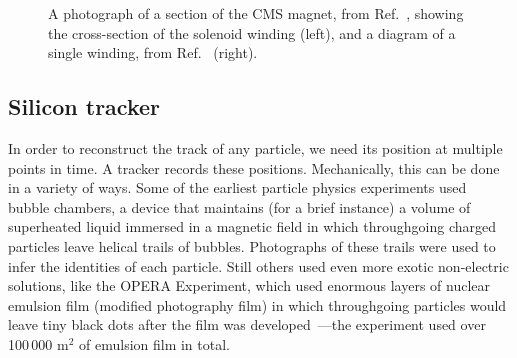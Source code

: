 \begin{figure}[htb]
    \centering
    \quad
    \caption[A photograph of a section of the CMS magnet, from Ref.~\cite{CourierSolenoid}, and a diagram of a single winding, from Ref.~\cite{CERN-LHCC-97-010}]{
        A photograph of a section of the CMS magnet, from Ref.~\cite{CourierSolenoid}, showing the cross-section of the solenoid winding (left), and a diagram of a single winding, from Ref.~\cite{CERN-LHCC-97-010} (right). 
    }
    \label{fig:cms_magnet}
\end{figure}

\subsection{Silicon tracker}
In order to reconstruct the track of any particle, we need its position at multiple points in time. 
A tracker records these positions. 
Mechanically, this can be done in a variety of ways. 
Some of the earliest particle physics experiments used bubble chambers, a device that maintains (for a brief instance) a volume of superheated liquid immersed in a magnetic field in which throughgoing charged particles leave helical trails of bubbles. 
Photographs of these trails were used to infer the identities of each particle. 
Still others used even more exotic non-electric solutions, like the OPERA Experiment, which used enormous layers of nuclear emulsion film (modified photography film) in which throughgoing particles would leave tiny black dots after the film was developed\footnotemark{}~\cite{Acquafredda:2009zz}---the experiment used over 100\,000 m$^2$ of emulsion film in total. 

